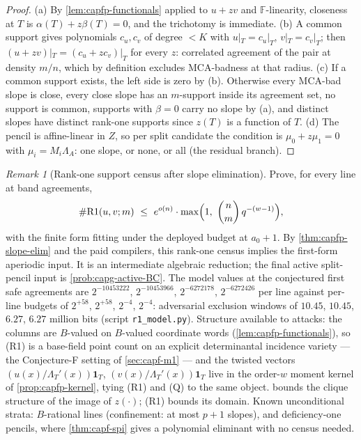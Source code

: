 \documentclass[11pt]{article}
\theoremstyle{definition}
\theoremstyle{remark}
\newtheorem{remark}[remark]{Remark}
\newcommand{\F}{\mathbb{F}}
\newcommand{\B}{B}
\begin{document}
\begin{proof}
\textup{(a)}  By \cref{lem:capfp-functionals} applied to $u+zv$ and $\F$-linearity, closeness at $T$ is $\alpha(T)+z\beta(T)=0$, and the trichotomy is immediate.
\textup{(b)}  A common support gives polynomials $c_u,c_v$ of degree $<K$ with $u|_T=c_u|_T$, $v|_T=c_v|_T$; then $(u+zv)|_T=(c_u+zc_v)|_T$ for every $z$: correlated agreement of the pair at density $m/n$, which by definition excludes MCA-badness at that radius.
\textup{(c)}  If a common support exists, the left side is zero by \textup{(b)}.  Otherwise every MCA-bad slope is close, every close slope has an $m$-support inside its agreement set, no support is common, supports with $\beta=0$ carry no slope by \textup{(a)}, and distinct slopes have distinct rank-one supports since $z(T)$ is a function of $T$.
\textup{(d)}  The pencil is affine-linear in $Z$, so per split candidate the condition is $\mu_0+z\mu_1=0$ with $\mu_i=M_i\Lambda_A$: one slope, or none, or all \textup(the residual branch\textup).
\end{proof}

\begin{remark}[Rank-one support census after slope elimination]\label{prob:capfp-R1}
Prove, for every line at band agreements,
\[
        \#\mathrm{R1}(u,v;m)\ \le\ e^{o(n)}\cdot\max\Bigl(1,\ \binom nm\,q^{-(w-1)}\Bigr),
\]
with the finite form fitting under the deployed budget at $a_0+1$.  By \cref{thm:capfp-slope-elim} and the paid compilers, this rank-one census implies the first-form aperiodic input.  It is an intermediate algebraic reduction; the final active split-pencil input is \cref{prob:capg-active-BC}.  The model values at the conjectured first safe agreements are $2^{-10453222}$, $2^{-10453966}$, $2^{-6272178}$, $2^{-6272426}$ per line against per-line budgets of $2^{+58}$, $2^{+58}$, $2^{-4}$, $2^{-4}$: adversarial exclusion windows of $10.45$, $10.45$, $6.27$, $6.27$ million bits \textup(script \texttt{r1\_model.py}\textup).  Structure available to attacks: the columns are $\B$-valued on $\B$-valued coordinate words \textup(\cref{lem:capfp-functionals}\textup), so \textup{(R1)} is a base-field point count on an explicit determinantal incidence variety --- the Conjecture-F setting of \cref{sec:capf-m1} --- and the twisted vectors $(u(x)/\Lambda_T'(x))\mathbf1_T$, $(v(x)/\Lambda_T'(x))\mathbf1_T$ live in the order-$w$ moment kernel of \cref{prop:capfp-kernel}, tying \textup{(R1)} and \textup{(Q)} to the same object.   bounds the clique structure of the image of $z(\cdot)$; \textup{(R1)} bounds its domain.  Known unconditional strata: $\B$-rational lines \textup(confinement: at most $p+1$ slopes\textup), and deficiency-one pencils, where \cref{thm:capf-spi} gives a polynomial eliminant with no census needed.
\end{remark}
\end{document}
